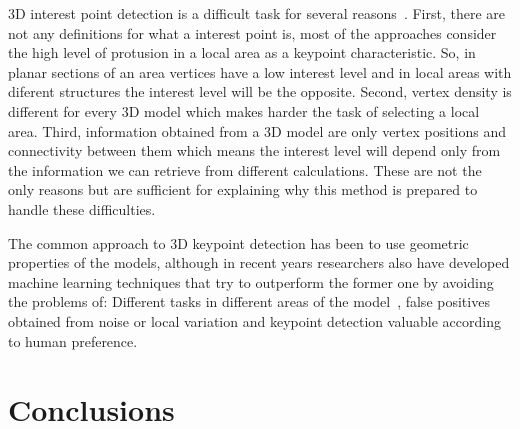 \documentclass{comjnl}
\begin{document}
3D interest point detection is a difficult task for several reasons~\cite{Discrim, harris3D}. 
First, there are not any definitions for what a interest point is, 
most of the approaches consider the high level of protusion in a local
area as a keypoint characteristic. So, in planar sections of an area
vertices have a low interest level and in local areas with diferent
structures the interest level will be the opposite. Second, vertex 
density is different for every 3D model which makes harder the task of
selecting a local area. Third, information obtained from a 3D model
are only vertex positions and connectivity between them which means
the interest level will depend only from the information we can
retrieve from different calculations. These are not the only reasons
but are sufficient for explaining why this method is prepared to
handle these difficulties. 

The common approach to 3D keypoint detection has been to use 
geometric properties of the models, although in recent years researchers
also have developed machine learning techniques that try to outperform the
former one by avoiding the problems of: Different tasks in different areas
of the model~\cite{DNN}, false positives obtained from noise or local
variation and keypoint detection valuable according to human preference. 





\section{Conclusions} \label{Conclusions}




\nocite{*}


% 

\end{document}
